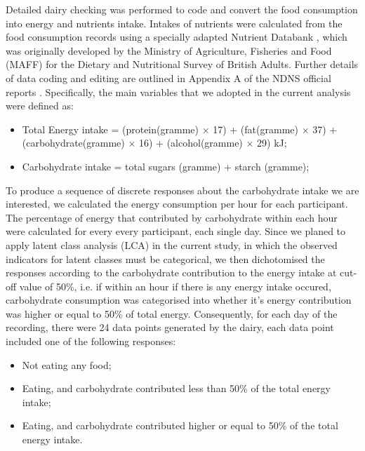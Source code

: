 Detailed dairy checking was performed to code and convert the food consumption into energy and nutrients intake. Intakes of nutrients were calculated from the food consumption records using a specially adapted Nutrient Databank \parencite{smithers1993maff}, which was originally developed by the Ministry of Agriculture, Fisheries and Food (MAFF) for the Dietary and Nutritional Survey of British Adults. Further details of data
coding and editing are outlined in Appendix A of the NDNS official reports \parencite{NDNSofficial}. Specifically, the main variables that we adopted in the current analysis were defined as: 

\begin{itemize}
	\item Total Energy intake = (protein(gramme) $\times$ 17) + (fat(gramme) $\times$ 37) + (carbohydrate(gramme) $\times$ 16) + (alcohol(gramme) $\times$ 29)  kJ;
	\item Carbohydrate intake = total sugars (gramme) + starch (gramme); 
\end{itemize}

To produce a sequence of discrete responses about the carbohydrate intake we are interested, we calculated the energy consumption per hour for each participant. The percentage of energy that contributed by carbohydrate within each hour were calculated for every every participant, each single day. Since we planed to apply latent class analysis (LCA) in the current study, in which the observed indicators for latent classes must be categorical, we then dichotomised the responses according to the carbohydrate contribution to the energy intake at cut-off value of 50\%, i.e. if within an hour if there is any energy intake occured, carbohydrate consumption was categorised into whether it's energy contribution was higher or equal to 50\% of total energy. Consequently, for each day of the recording, there were 24 data points generated by the dairy, each data point included one of the following responses:

\begin{itemize}
	\item Not eating any food; 
	\item Eating, and carbohydrate contributed less than 50\% of the total energy intake;
	\item Eating, and carbohydrate contributed higher or equal to 50\% of the total energy intake.
\end{itemize}
\vspace{-0.5cm}


